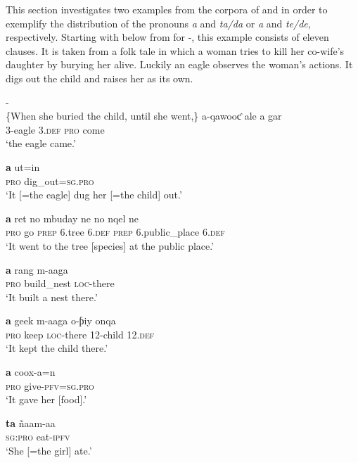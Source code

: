 \documentclass[output=paper
,newtxmath
,modfonts
,nonflat]{langsci/langscibook}
\begin{document}
This section investigates two examples from the corpora of \citet{Faye1979} and \citet{Renaudier2012} in order to exemplify the distribution of the pronouns \textit{a} and \textit{ta/da} or \textit{a} and \textit{te/de}, respectively. Starting with  below from \citet{Faye1979} for -, this example consists of eleven clauses. It is taken from a folk tale in which a woman tries to kill her co-wife’s daughter by burying her alive. Luckily an eagle observes the woman’s actions. It digs out the child and raises her as its own.

\ea\label{ex:apel:16}
{- \citep[283]{Faye1979}}\\
{\-\hspace{0.5cm}\{When she buried the child, until she went,\}}
\ea\label{ex:apel:16a}
\gll a-qawooƈ ale a gar\\
     \textsc{3-}eagle \textsc{3.def} \textsc{pro} come \\
\glt ‘the eagle came.’

\ex\label{ex:apel:16b}
\gll \textbf{a}  ut=in\\
     \textsc{pro} dig\textsc{\_}out\textsc{=sg.pro} \\
\glt ‘It [=the eagle] dug her [=the child] out.’

\ex\label{ex:apel:16c}
\gll \textbf{a} ret no mbuday ne no nqel ne         \\
     \textsc{pro} go \textsc{prep} \textsc{6.}tree \textsc{6.def} \textsc{prep} 6.public\textsc{\_}place \textsc{6.def} \\
\glt ‘It went to the tree [species] at the public place.’   

\ex\label{ex:apel:16d}
\gll \textbf{a} rang m-aaga  \\
     \textsc{pro} build\textsc{\_}nest \textsc{loc-}there \\
\glt ‘It built a nest there.’

\ex\label{ex:apel:16e}
\gll \textbf{a} geek m-aaga o-ƥiy onqa  \\
     \textsc{pro} keep \textsc{loc-}there \textsc{12-}child \textsc{12.def}\\
\glt ‘It kept the child there.’


\ex\label{ex:apel:16f}
\gll \textbf{a} coox-a=n\\
     \textsc{pro} give\textsc{-pfv=sg.pro}\\
\glt ‘It gave her [food].’


\ex\label{ex:apel:16g}
\gll \textbf{ta} ñaam-aa\\
     \textsc{sg:pro} eat\textsc{-ipfv} \\
\glt ‘She [=the girl] ate.’
\end{document}
